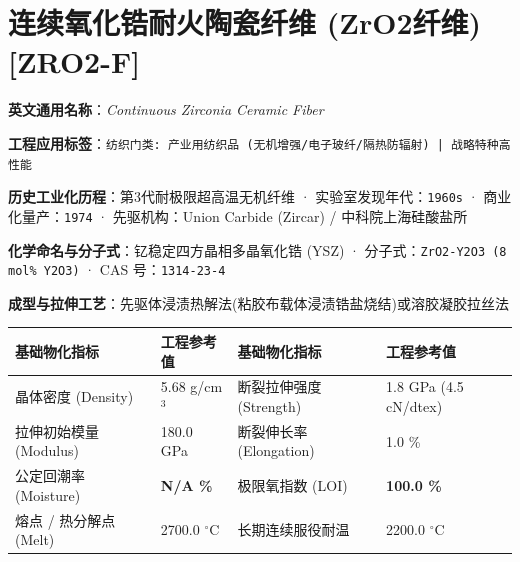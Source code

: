 \documentclass[11pt,openright,twoside,UTF8]{ctexbook}
\begin{document}
\section{连续氧化锆耐火陶瓷纤维 (ZrO2纤维) [ZRO2-F]}
\label{sec:zro2-f}

\noindent\textbf{英文通用名称}：\textit{Continuous Zirconia Ceramic Fiber}\par
\noindent\textbf{工程应用标签}：\texttt{纺织门类: 产业用纺织品 (无机增强/电子玻纤/隔热防辐射) | 战略特种高性能}\par
\noindent\textbf{历史工业化历程}：第3代耐极限超高温无机纤维 · 实验室发现年代：\texttt{1960s} · 商业化量产：\texttt{1974} · 先驱机构：Union Carbide (Zircar) / 中科院上海硅酸盐所\par
\noindent\textbf{化学命名与分子式}：钇稳定四方晶相多晶氧化锆 (YSZ) · 分子式：\texttt{ZrO2-Y2O3 (8 mol\% Y2O3)} · CAS 号：\texttt{1314-23-4}\par
\noindent\textbf{成型与拉伸工艺}：先驱体浸渍热解法(粘胶布载体浸渍锆盐烧结)或溶胶凝胶拉丝法\par

\vspace{0.15cm}
\begin{center}
\small
\begin{tabularx}{\textwidth}{p{3.8cm}Xp{3.8cm}X}
\toprule
\textbf{基础物化指标} & \textbf{工程参考值} & \textbf{基础物化指标} & \textbf{工程参考值} \\
\midrule
晶体密度 (Density) & 5.68 g/cm$^3$ & 断裂拉伸强度 (Strength) & 1.8 GPa (4.5 cN/dtex) \\
拉伸初始模量 (Modulus) & 180.0 GPa & 断裂伸长率 (Elongation) & 1.0 \% \\
公定回潮率 (Moisture) & \textbf{N/A \%} & 极限氧指数 (LOI) & \textbf{100.0 \%} \\
熔点 / 热分解点 (Melt) & 2700.0 $^\circ\mathrm{C}$ & 长期连续服役耐温 & 2200.0 $^\circ\mathrm{C}$ \\
\bottomrule
\end{tabularx}
\end{center}
\vspace{0.15cm}
\end{document}
